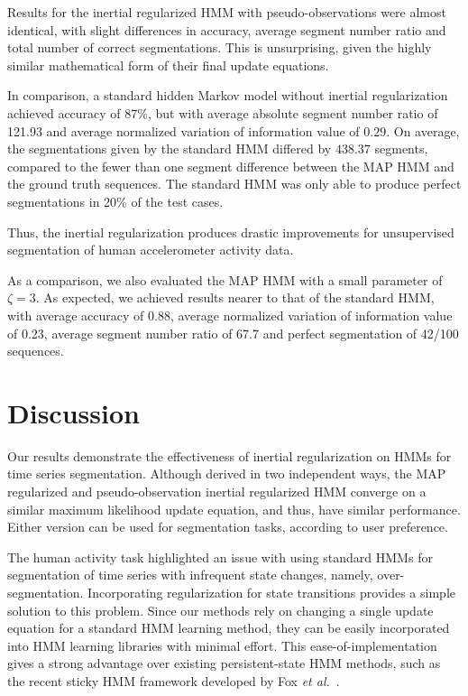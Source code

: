 \documentclass[12pt]{article}
\begin{document}
Results for the inertial regularized HMM with pseudo-observations were almost identical, with slight differences in accuracy, average segment number ratio and total number of correct segmentations. This is unsurprising, given the highly similar mathematical form of their final update equations.

In comparison, a standard hidden Markov model without inertial regularization achieved accuracy of 87\%, but with average absolute segment number ratio of 121.93 and average normalized variation of information value of $0.29$. On average, the segmentations given by the standard HMM differed by $438.37$ segments, compared to the fewer than one segment difference between the MAP HMM and the ground truth sequences. The standard HMM was only able to produce perfect segmentations in 20\% of the test cases.

Thus, the inertial regularization produces drastic improvements for unsupervised segmentation of human accelerometer activity data.

As a comparison, we also evaluated the MAP HMM with a small parameter of $\zeta = 3$. As expected, we achieved results nearer to that of the standard HMM, with average accuracy of 0.88, average normalized variation of information value of 0.23, average segment number ratio of 67.7 and perfect segmentation of 42/100 sequences.

\section{Discussion}

Our results demonstrate the effectiveness of inertial regularization on HMMs for time series segmentation. Although derived in two independent ways, the MAP regularized and pseudo-observation inertial regularized HMM converge on a similar maximum likelihood update equation, and thus, have similar performance. Either version can be used for segmentation tasks, according to user preference. 

The human activity task highlighted an issue with using standard HMMs for segmentation of time series with infrequent state changes, namely, over-segmentation. Incorporating regularization for state transitions provides a simple solution to this problem. Since our methods rely on changing a single update equation for a standard HMM learning method, they can be easily incorporated into HMM learning libraries with minimal effort. This ease-of-implementation gives a strong advantage over existing persistent-state HMM methods, such as the recent sticky HMM framework developed by Fox \emph{et al.}~\cite{fox2011sticky}.
\end{document}
